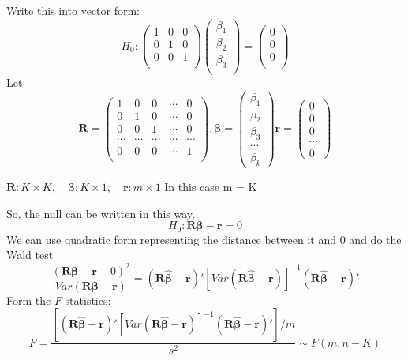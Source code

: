\documentclass[12pt]{article}
\begin{document}
Write this into vector form:
\begin{equation*}
H_0:
\begin{pmatrix}
		1 & 0 & 0\\
		0 & 1 & 0\\
		0 & 0 & 1\\
\end{pmatrix}
\begin{pmatrix}
\beta_1\\
\beta_2\\
\beta_3\\
\end{pmatrix}
=
\begin{pmatrix}
0\\
0\\
0\\
\end{pmatrix}
\end{equation*}
Let 
\begin{equation*}
\bm{R}= 
\begin{pmatrix}
		1 & 0 & 0 & \cdots &0\\
		0 & 1 & 0 & \cdots &0\\
		0 & 0 & 1 & \cdots &0\\
		\cdots&\cdots&\cdots&\cdots &\cdots\\
		0 & 0 & 0 & \cdots &1\\
\end{pmatrix},
\bm{\beta}= 
\begin{pmatrix}
\beta_1\\
\beta_2\\
\beta_3\\
\cdots\\
\beta_{k}
\end{pmatrix}
\bm{r}= 
\begin{pmatrix}
0\\
0\\
0\\
\cdots\\
0
\end{pmatrix}
\end{equation*}

$ \bm{R}: K  \times K, \quad \bm{\beta}: K  \times 1, \quad \bm{r}: m  \times 1$ 
In this case m = K

So, the null can be written in this way,
\begin{equation*}
H_0: \bm{R} \bm{\beta} - \bm{r} = 0
\end{equation*}
We can use quadratic form representing the distance between it and 0 and do the Wald
test
\begin{equation*}
		\frac{(\bm{R} \bm{\beta - r}  - 0)^{2}}{Var(\bm{R \beta - r})} = 
		(\bm{R  \widehat{\beta} - r})'[Var(\bm{R  \widehat{\beta} - r})]^{ - 1}
		(\bm{R  \widehat{\beta} - r})'
\end{equation*}
Form the $ F $ statistics:
\begin{equation*}
F = \frac{
		[(\bm{R  \widehat{\beta} - r})'[Var(\bm{R  \widehat{\beta} - r})]^{ - 1}
		(\bm{R  \widehat{\beta} - r})']/m
}{s^{2}} \sim F(m,n - K)
\end{equation*}
\end{document}
